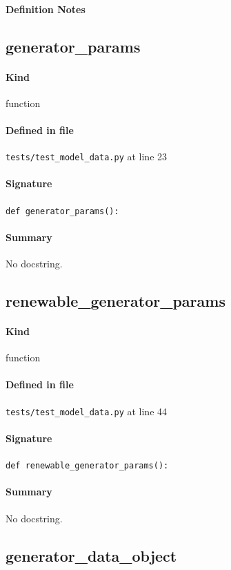 \documentclass[11pt]{report}
\begin{document}
\paragraph{Definition Notes}
\subsection{generator\_params}
\label{def:tests-test_model_data.py:generator_params:L23}
\paragraph{Kind} function
\paragraph{Defined in file} \texttt{tests/test\_model\_data.py} at line 23
\paragraph{Signature} \texttt{def generator\_params():}
\paragraph{Summary} No docstring.
\subsection{renewable\_generator\_params}
\label{def:tests-test_model_data.py:renewable_generator_params:L44}
\paragraph{Kind} function
\paragraph{Defined in file} \texttt{tests/test\_model\_data.py} at line 44
\paragraph{Signature} \texttt{def renewable\_generator\_params():}
\paragraph{Summary} No docstring.
\subsection{generator\_data\_object}
\label{def:tests-test_model_data.py:generator_data_object:L56}
\end{document}

